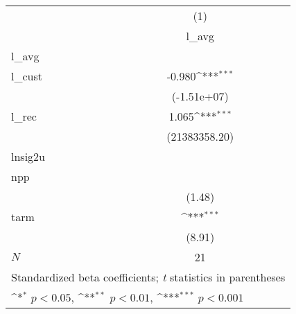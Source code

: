 {
\def\sym#1{\ifmmode^{#1}\else\(^{#1}\)\fi}
\begin{tabular}{l*{1}{c}}
\hline\hline
            &\multicolumn{1}{c}{(1)}\\
            &\multicolumn{1}{c}{l\_avg}\\
\hline
l\_avg       &                     \\
l\_cust      &      -0.980\sym{***}\\
            & (-1.51e+07)         \\
[1em]
l\_rec       &       1.065\sym{***}\\
            &(21383358.20)         \\
\hline
lnsig2u     &                     \\
npp         &                     \\
            &      (1.48)         \\
[1em]
tarm        &            \sym{***}\\
            &      (8.91)         \\
\hline
\(N\)       &          21         \\
\hline\hline
\multicolumn{2}{l}{\footnotesize Standardized beta coefficients; \textit{t} statistics in parentheses}\\
\multicolumn{2}{l}{\footnotesize \sym{*} \(p<0.05\), \sym{**} \(p<0.01\), \sym{***} \(p<0.001\)}\\
\end{tabular}
}

